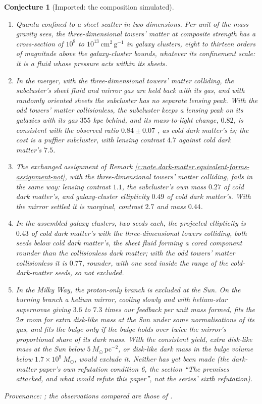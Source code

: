 \documentclass[11pt]{article}
\newtheorem{conjecture}[theorem]{Conjecture}
\theoremstyle{definition}
\theoremstyle{plain}
\begin{document}
\begin{conjecture}[Imported: the composition simulated]\label{c:dark-matter.imported-composition-simulated}
\begin{enumerate}
\item[(i)] Quanta confined to a sheet scatter in two dimensions. Per unit of the mass gravity sees, the three-dimensional towers' matter at composite strength has a cross-section of $10^{8}$ to $10^{13}\ \mathrm{cm^{2}\,g^{-1}}$ in galaxy clusters, eight to thirteen orders of magnitude above the galaxy-cluster bounds, whatever its confinement scale: it is a fluid whose pressure acts within its sheets.
\item[(ii)] In the merger, with the three-dimensional towers' matter colliding, the subcluster's sheet fluid and mirror gas are held back with its gas, and with randomly oriented sheets the subcluster has no separate lensing peak. With the odd towers' matter collisionless, the subcluster keeps a lensing peak on its galaxies with its gas $355$ kpc behind, and its mass-to-light change, $0.82$, is consistent with the observed ratio $0.84 \pm 0.07$ \cite{Randall2008}, as cold dark matter's is; the cost is a puffier subcluster, with lensing contrast $4.7$ against cold dark matter's $7.5$.
\item[(ii$'$)] The exchanged assignment of Remark \ref{c:note.dark-matter.equivalent-forms-assignment-not}, with the three-dimensional towers' matter colliding, fails in the same way: lensing contrast $1.1$, the subcluster's own mass $0.27$ of cold dark matter's, and galaxy-cluster ellipticity $0.49$ of cold dark matter's. With the mirror settled it is marginal, contrast $2.7$ and mass $0.44$.
\item[(iii)] In the assembled galaxy clusters, two seeds each, the projected ellipticity is $0.43$ of cold dark matter's with the three-dimensional towers colliding, both seeds below cold dark matter's, the sheet fluid forming a cored component rounder than the collisionless dark matter; with the odd towers' matter collisionless it is $0.77$, rounder, with one seed inside the range of the cold-dark-matter seeds, so not excluded.
\item[(iv)] In the Milky Way, the proton-only branch is excluded at the Sun. On the burning branch a helium mirror, cooling slowly and with helium-star supernovae giving $3.6$ to $7.3$ times our feedback per unit mass formed, fits the $2\sigma$ room for extra disk-like mass at the Sun under some normalisations of its gas, and fits the bulge only if the bulge holds over twice the mirror's proportional share of its dark mass. With the consistent yield, extra disk-like mass at the Sun below $5\ M_{\odot}\,\mathrm{pc^{-2}}$, or disk-like dark mass in the bulge volume below $1.7 \times 10^{9}\ M_{\odot}$, would exclude it. Neither has yet been made (the dark-matter paper's own refutation condition 6, the section ``The premises attacked, and what would refute this paper'', not the series' sixth refutation).
\end{enumerate}
\emph{Provenance:} \cite[Prop.~3.1, Cor.~3.4, Obs.~7.1, 7.2, 9.1, Tables~3, 4]{ButlerT14b}; the observations compared are those of \cite{Clowe2006, Randall2008}.
\end{conjecture}
\end{document}

